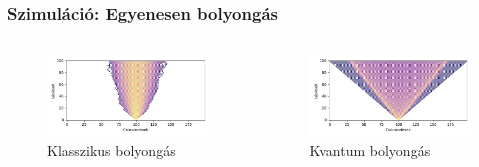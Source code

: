 \documentclass[aspectratio=169]{beamer}
\begin{document}
\begin{frame}
  \frametitle{Szimuláció: Egyenesen bolyongás}

  \begin{columns}[onlytextwidth]
    \begin{column}{.5\textwidth}
      \begin{figure}
        \includegraphics[width=\textwidth]{./figures/classical_simulation_short.jpg}
        \caption{\hspace{0.71cm}Klasszikus bolyongás}
      \end{figure}
    \end{column}
    \hfill
    \begin{column}{.5\textwidth}
      \begin{figure}
        \includegraphics[width=\textwidth]{./figures/quantum_simulation_short.jpg}
        \caption{\hspace{0.73cm}Kvantum bolyongás}
      \end{figure}
    \end{column}
  \end{columns}
\end{frame}
\end{document}
